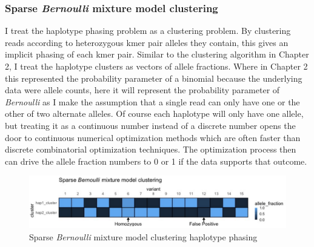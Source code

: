 \subsubsection{Sparse \textit{Bernoulli} mixture model clustering}

\par{
I treat the haplotype phasing problem as a clustering problem. By clustering reads according to heterozygous kmer pair alleles they contain, this gives an implicit phasing of each kmer pair. Similar to the clustering algorithm in Chapter 2, I treat the haplotype clusters as vectors of allele fractions. Where in Chapter 2 this represented the probability parameter of a binomial because the underlying data were allele counts, here it will represent the probability parameter of \textit{Bernoulli} as I make the assumption that a single read can only have one or the other of two alternate alleles. Of course each haplotype will only have one allele, but treating it as a continuous number instead of a discrete number opens the door to continuous numerical optimization methods which are often faster than discrete combinatorial optimization techniques. The optimization process then can drive the allele fraction numbers to 0 or 1 if the data supports that outcome. \\
} 

\begin{figure}[htbp!]
\caption{Sparse \textit{Bernoulli} mixture model clustering haplotype phasing}
\label{figure:scaff}
\begin{centering}
\includegraphics[width=\textwidth]{sparsebernoulli.png}
\end{centering}
\end{figure}

